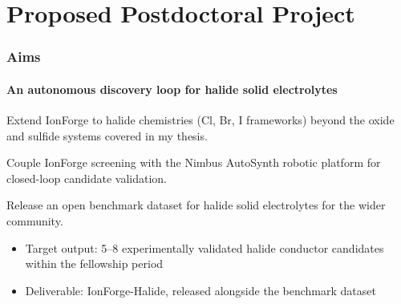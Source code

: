 \section{Proposed Postdoctoral Project}

\begin{frame}
\frametitle{Aims}
\framesubtitle{An autonomous discovery loop for halide solid electrolytes}

\noindent
\begin{minipage}[t]{0.315\linewidth}
\begin{tcolorbox}[colback=primary!6,colframe=primary,title={\small Aim 1},fonttitle=\bfseries,coltitle=white,height=4.7cm]
\small Extend IonForge to halide chemistries (Cl, Br, I frameworks) beyond the oxide and sulfide systems covered in my thesis.
\end{tcolorbox}
\end{minipage}\hfill
\begin{minipage}[t]{0.315\linewidth}
\begin{tcolorbox}[colback=secondary!10,colframe=secondary,title={\small Aim 2},fonttitle=\bfseries,coltitle=white,height=4.7cm]
\small Couple IonForge screening with the Nimbus AutoSynth robotic platform for closed-loop candidate validation.
\end{tcolorbox}
\end{minipage}\hfill
\begin{minipage}[t]{0.315\linewidth}
\begin{tcolorbox}[colback=accent!12,colframe=accent,title={\small Aim 3},fonttitle=\bfseries,coltitle=black,height=4.7cm]
\small Release an open benchmark dataset for halide solid electrolytes for the wider community.
\end{tcolorbox}
\end{minipage}

\vspace{0.5cm}
\begin{itemize}
  \item Target output: 5--8 experimentally validated halide conductor candidates within the fellowship period
  \item Deliverable: IonForge-Halide, released alongside the benchmark dataset
\end{itemize}
\end{frame}

